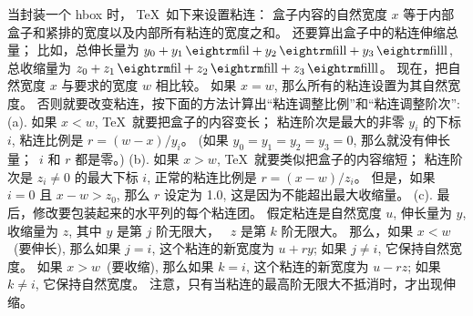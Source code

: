 \danger \1当封装一个 hbox 时， \TeX\ 如下来设置粘连：
盒子内容的自然宽度 $x$ 等于内部盒子和紧排的宽度以及内部所有粘连的宽度之和。%
还要算出盒子中的粘连伸缩总量；
比如，总伸长量为 $y_0+y_1\,{\rm fil}+y_2\,{\rm fill}+y_3\,{\rm filll}$,
总收缩量为 $z_0+z_1\,{\rm fil}+z_2\,{\rm fill}+z_3\,{\rm filll}$。%
现在，把自然宽度 $x$ 与要求的宽度 $w$ 相比较。%
如果 $x=w$, 那么所有的粘连设置为其自然宽度。%
否则就要改变粘连，按下面的方法计算出``粘连调整比例''和``粘连调整阶次'':
(a). 如果 $x<w$, \TeX\ 就要把盒子的内容变长；
粘连阶次是最大的非零 $y_i$ 的下标 $i$,
粘连比例是 $r=(w-x)/y_i$。%
(如果 $y_0=y_1=y_2=y_3=0$, 那么就没有伸长量；~$i$ 和 $r$ 都是零。)
(b). 如果 $x>w$, \TeX\ 就要类似把盒子的内容缩短；
粘连阶次是 $z_i\ne0$ 的最大下标 $i$, 正常的粘连比例是 $r=(x-w)/z_i$。%
但是，如果 $i=0$ 且 $x-w>z_0$, 那么 $r$ 设定为 1.0, 这是因为不能超出最大收缩量。%
(c). 最后，修改要包装起来的水平列的每个粘连团。%
假定粘连是自然宽度 $u$, 伸长量为 $y$, 收缩量为 $z$, 其中 $y$ 是第 $j$ 阶无限大，
~$z$ 是第 $k$ 阶无限大。%
那么，如果 $x<w$~(要伸长), 那么如果 $j=i$, 这个粘连的新宽度为 $u+ry$;
如果 $j\ne i$, 它保持自然宽度。%
如果 $x>w$~(要收缩), 那么如果 $k=i$, 这个粘连的新宽度为 $u-rz$;
如果 $k\ne i$, 它保持自然宽\hbox{度。}%
注意，只有当粘连的最高阶无限大不抵消时，才出现伸缩。

